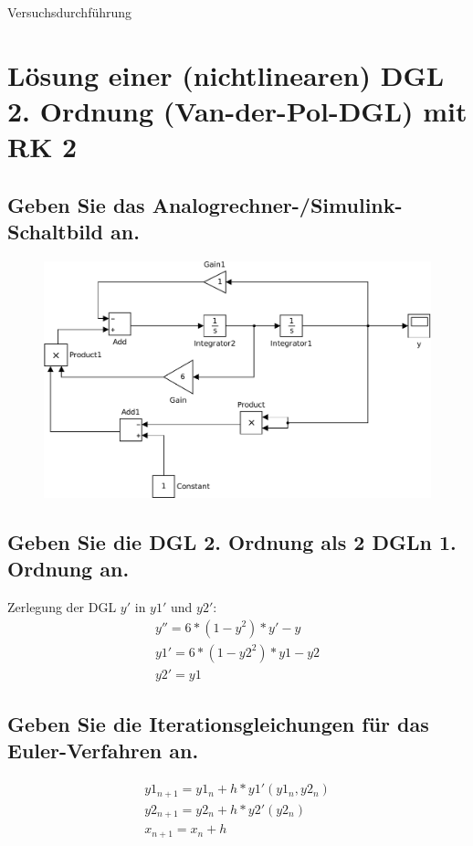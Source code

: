 \documentclass[10pt,a4paper]{article}
\begin{document}
\begin{center}
\begin{large}
Versuchsdurchführung
\end{large}
\end{center}


\section{Lösung einer (nichtlinearen) DGL 2. Ordnung (Van-der-Pol-DGL) mit RK 2}
\subsection{Geben Sie das Analogrechner-/Simulink-Schaltbild an.}
\begin{figure}[H]
\centering
\includegraphics[width=0.9\linewidth]{../screenshots/2}
\end{figure}


\subsection{Geben Sie die DGL 2. Ordnung als 2 DGLn 1. Ordnung an.}

Zerlegung der DGL $y'$ in $y1'$ und $y2'$:
\begin{align}
y'' = 6 * (1-y^2) * y' - y
\\y1' = 6 * (1-y2^2) * y1 - y2
\\y2' = y1
\end{align}

\subsection{Geben Sie die Iterationsgleichungen für das Euler-Verfahren an.}

\begin{align}
y1_{n+1} = y1_n + h * y1'(y1_n,y2_n)
\\y2_{n+1} = y2_n + h * y2'(y2_n)
\\x_{n+1} = x_n + h
\end{align}
\end{document}
